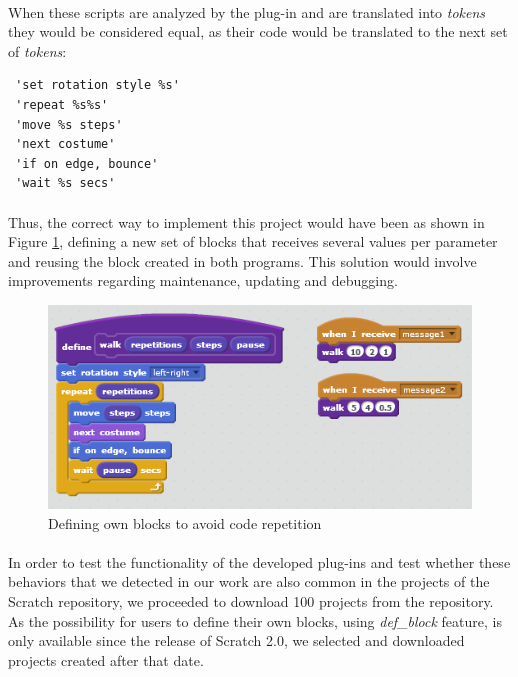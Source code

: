 \documentclass[a4paper,10pt]{article}
\begin{document}
\paragraph{}When these scripts are analyzed by the plug-in and are translated into \textit{tokens} they would be considered equal, as their code would be translated to the next set of \textit{tokens}:
\begin{verbatim}
 'set rotation style %s'
 'repeat %s%s'
 'move %s steps'
 'next costume'
 'if on edge, bounce'
 'wait %s secs'
\end{verbatim}
\paragraph{}Thus, the correct way to implement this project would have been as shown in Figure \ref{fig:CodeRepetition2}, defining a new set of blocks that receives several values per parameter and reusing the block created in both programs. This solution would involve improvements regarding maintenance, updating and debugging.

\begin{figure}
  \centering
    \includegraphics{img/CodeRepetition2.png}
  \caption{Defining own blocks to avoid code repetition}
  \label{fig:CodeRepetition2}
\end{figure}

\paragraph{}In order to test the functionality of the developed plug-ins and test whether these behaviors that we detected in our work are also common in the projects of the Scratch repository, we proceeded to download 100 projects from the repository. As the possibility for users to define their own blocks, using \textit{def\_block} feature, is only available since the release of Scratch 2.0, we selected and downloaded projects created after that date.
\end{document}
